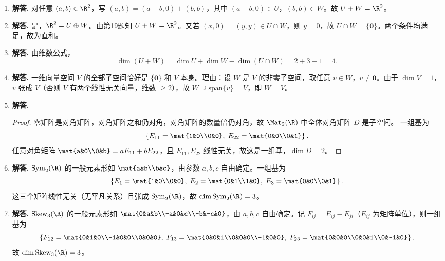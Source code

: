 \begin{enumerate}[label=\textbf{\arabic*.}, leftmargin=*, itemsep=1em]
\item \textbf{解答.}
对任意 $(a,b)\in\R^2$，写 $(a,b)=(a-b,0)+(b,b)$，其中 $(a-b,0)\in U$，$(b,b)\in W$。故 $U+W=\R^2$。

\item \textbf{解答.}
是，$\R^2=U\oplus W$。由第19题知 $U+W=\R^2$。又若 $(x,0)=(y,y)\in U\cap W$，则 $y=0$，故 $U\cap W=\{\mathbf{0}\}$。两个条件均满足，故为直和。

\item \textbf{解答.}
由维数公式，
\[
\dim(U+W)=\dim U+\dim W-\dim(U\cap W)=2+3-1=4.
\]

\item \textbf{解答.}
一维向量空间 $V$ 的全部子空间恰好是 $\{\mathbf{0}\}$ 和 $V$ 本身。理由：设 $W$ 是 $V$ 的非零子空间，取任意 $v\in W$，$v\ne\mathbf{0}$。由于 $\dim V=1$，$v$ 张成 $V$（否则 $V$ 有两个线性无关向量，维数 $\ge 2$），故 $W\supseteq\mathrm{span}\{v\}=V$，即 $W=V$。

\item \textbf{解答.}
\begin{proof}
零矩阵是对角矩阵，对角矩阵之和仍对角，对角矩阵的数量倍仍对角，故 $\Mat_2(\R)$ 中全体对角矩阵 $D$ 是子空间。
一组基为
\[
\left\{E_{11}=\mat{1&0\\0&0},\;E_{22}=\mat{0&0\\0&1}\right\}.
\]
任意对角矩阵 $\mat{a&0\\0&b}=aE_{11}+bE_{22}$，且 $E_{11},E_{22}$ 线性无关，故这是一组基，$\dim D=2$。
\end{proof}

\item \textbf{解答.}
$\mathrm{Sym}_2(\R)$ 的一般元素形如 $\mat{a&b\\b&c}$，由参数 $a,b,c$ 自由确定。一组基为
\[
\left\{E_1=\mat{1&0\\0&0},\;E_2=\mat{0&1\\1&0},\;E_3=\mat{0&0\\0&1}\right\}.
\]
这三个矩阵线性无关（无平凡关系）且张成 $\mathrm{Sym}_2(\R)$，故 $\dim\mathrm{Sym}_2(\R)=3$。

\item \textbf{解答.}
$\mathrm{Skew}_3(\R)$ 的一般元素形如 $\mat{0&a&b\\-a&0&c\\-b&-c&0}$，由 $a,b,c$ 自由确定。记 $F_{ij}=E_{ij}-E_{ji}$（$E_{ij}$ 为矩阵单位），则一组基为
\[
\left\{F_{12}=\mat{0&1&0\\-1&0&0\\0&0&0},\;
F_{13}=\mat{0&0&1\\0&0&0\\-1&0&0},\;
F_{23}=\mat{0&0&0\\0&0&1\\0&-1&0}\right\}.
\]
故 $\dim\mathrm{Skew}_3(\R)=3$。


\end{enumerate}
